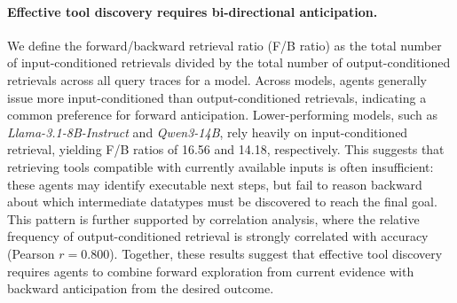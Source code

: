 \documentclass{llmxive}
\begin{document}
\paragraph{Effective tool discovery requires bi-directional anticipation.}
We define the forward/backward retrieval ratio (F/B ratio) as the total number of input-conditioned retrievals divided by the total number of output-conditioned retrievals across all query traces for a model. 
Across models, agents generally issue more input-conditioned than output-conditioned retrievals, indicating a common preference for forward anticipation. 
Lower-performing models, such as \textit{Llama-3.1-8B-Instruct} and \textit{Qwen3-14B}, rely heavily on input-conditioned retrieval, yielding F/B ratios of 16.56 and 14.18, respectively. 
This suggests that retrieving tools compatible with currently available inputs is often insufficient: these agents may identify executable next steps, but fail to reason backward about which intermediate datatypes must be discovered to reach the final goal.
This pattern is further supported by correlation analysis, where the relative frequency of output-conditioned retrieval is strongly correlated with accuracy (Pearson $r=0.800$). 
Together, these results suggest that effective tool discovery requires agents to combine forward exploration from current evidence with backward anticipation from the desired outcome.

\end{document}
